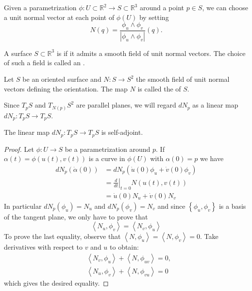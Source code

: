 \documentclass[10pt]{article}
\begin{document}
Given a parametrization $\phi: U \subset \mathbb{R}^2 \rightarrow S \subset \mathbb{R}^3$ around a point $p \in S$, we can choose a unit normal vector at each point of $\phi(U)$ by setting
$$
N(q)=\frac{\phi_u \wedge \phi_v}{\left|\phi_u \wedge \phi_v\right|}(q) .
$$

\begin{definition}[Orientable]
    A surface $S \subset \mathbb{R}^3$ is  if it admits a smooth field of unit normal vectors. The choice of such a field is called an .
\end{definition}

\begin{definition}
    Let $S$ be an oriented surface and $N: S \rightarrow S^2$ the smooth field of unit normal vectors defining the orientation. The map $N$ is called the  of $S$.
\end{definition}

Since $T_p S$ and $T_{N(p)} S^2$ are parallel planes, we will regard $d N_p$ as a linear map $d N_p: T_p S \rightarrow T_p S$. 

\begin{proposition}
    The linear map $d N_p: T_p S \rightarrow T_p S$ is self-adjoint.
\end{proposition}
\begin{proof}
    Let $\phi: U \rightarrow S$ be a parametrization around $p$. If $\alpha(t)=\phi(u(t), v(t))$ is a curve in $\phi(U)$ with $\alpha(0)=p$ we have
    $$
    \begin{aligned}
    d N_p(\dot{\alpha}(0)) & =d N_p\left(\dot{u}(0) \phi_u+\dot{v}(0) \phi_v\right) \\
    & =\left.\frac{d}{d t}\right|_{t=0} N(u(t), v(t)) \\
    & =\dot{u}(0) N_u+\dot{v}(0) N_v
    \end{aligned}
    $$
    In particular $d N_p\left(\phi_u\right)=N_u$ and $d N_p\left(\phi_v\right)=N_v$ and since $\left\{\phi_u, \phi_v\right\}$ is a basis of the tangent plane, we only have to prove that
    $$
    \left\langle N_u, \phi_v\right\rangle=\left\langle N_v, \phi_u\right\rangle
    $$
    To prove the last equality, observe that $\left\langle N, \phi_u\right\rangle=\left\langle N, \phi_v\right\rangle=0$. Take derivatives with respect to $v$ and $u$ to obtain:
    $$
    \begin{aligned}
    & \left\langle N_v, \phi_u\right\rangle+\left\langle N, \phi_{u v}\right\rangle=0, \\
    & \left\langle N_u, \phi_v\right\rangle+\left\langle N, \phi_{v u}\right\rangle=0
    \end{aligned}
    $$
    which gives the desired equality.
\end{proof}
\end{document}
